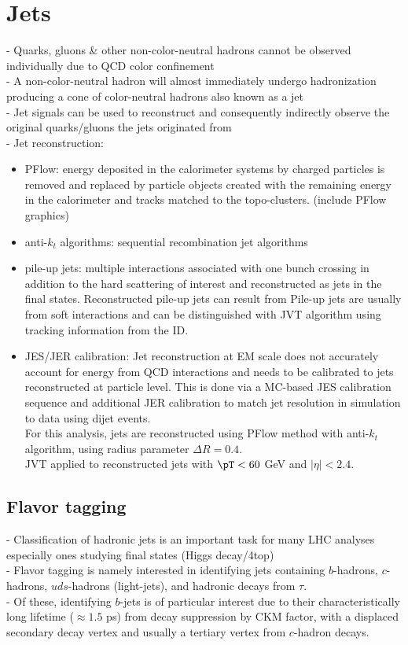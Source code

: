 \documentclass[../thesis.tex]{subfiles}
\begin{document}
\section{Jets}
- Quarks, gluons \& other non-color-neutral hadrons cannot be observed individually due to QCD color confinement\\
- A non-color-neutral hadron will almost immediately undergo hadronization producing a cone of color-neutral hadrons also known as a jet\\
- Jet signals can be used to reconstruct and consequently indirectly observe the original quarks/gluons the jets originated from\\
- Jet reconstruction:
\begin{itemize}
\item PFlow: energy deposited in the calorimeter systems by charged particles is removed and replaced by particle objects created with the remaining energy in the calorimeter and tracks matched to the topo-clusters. (include PFlow graphics)
\item anti-$k_t$ algorithms: sequential recombination jet algorithms
\item pile-up jets: multiple interactions associated with one bunch crossing in addition to the hard scattering of interest and reconstructed as jets in the final states. Reconstructed pile-up jets can result from   Pile-up jets are usually from soft interactions and can be distinguished with JVT algorithm using tracking information from the ID.
\item JES/JER calibration: Jet reconstruction at EM scale does not accurately account for energy from QCD interactions and needs to be calibrated to jets reconstructed at particle level. This is done via a MC-based JES calibration sequence and additional JER calibration to match jet resolution in simulation to data using dijet events.\\
For this analysis, jets are reconstructed using PFlow method with anti-$k_t$ algorithm, using radius parameter $\Delta R=0.4$.\\
JVT applied to reconstructed jets with $\pT < 60$ GeV and $|\eta|<2.4$.
\end{itemize}
\subsection{Flavor tagging}
\label{sec:ftag}
- Classification of hadronic jets is an important task for many LHC analyses especially ones studying final states (Higgs decay/4top)\\
- Flavor tagging is namely interested in identifying jets containing $b$-hadrons, $c$-hadrons, $uds$-hadrons (light-jets), and hadronic decays from $\tau$.\\
- Of these, identifying $b$-jets is of particular interest due to their characteristically long lifetime ($\approx 1.5$ ps) from decay suppression by CKM factor, with a displaced secondary decay vertex and usually a tertiary vertex from $c$-hadron decays.
\end{document}
